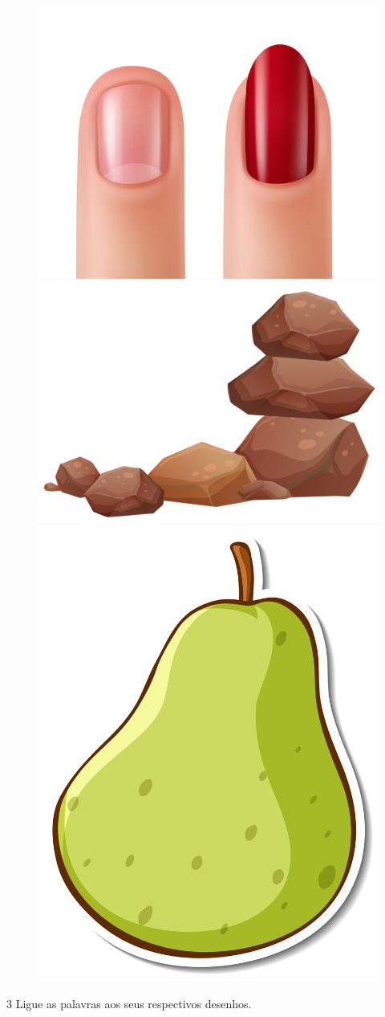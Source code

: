 
\vspace*{-1em}

\begin{figure}[H]
\centering
\includegraphics[width=.25\textwidth]{media/image55.jpeg}
\includegraphics[width=.25\textwidth]{media/image56.jpg}
\includegraphics[width=.15\textwidth]{media/image57.jpg}
\end{figure}
\enlargethispage{2\baselineskip}




\num{3} Ligue as palavras aos seus respectivos desenhos.


